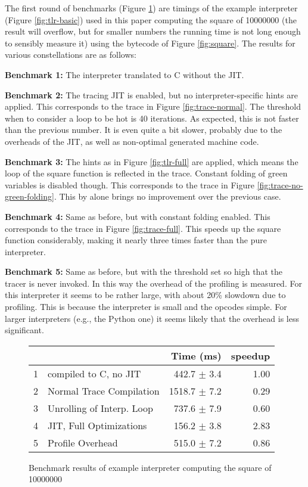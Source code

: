 \documentclass{sig-alternate}
\newcommand\eg{e.g.,\xspace}
\begin{document}
The first round of benchmarks (Figure \ref{fig:bench1}) are timings of the
example interpreter (Figure \ref{fig:tlr-basic}) used in this paper computing
the square of 10000000 (the result will overflow, but for smaller numbers the
running time is not long enough to sensibly measure it)
using the bytecode of Figure \ref{fig:square}. The results for various
constellations are as follows:

\textbf{Benchmark 1:} The interpreter translated to C without the JIT.

\textbf{Benchmark 2:} The tracing JIT is enabled, but no inter\-preter-specific
hints are applied. This corresponds to the trace in Figure
\ref{fig:trace-normal}.  The threshold when to consider a loop to be hot is 40
iterations.  As expected, this is not faster than the previous number. It is
even quite a bit slower, probably due to the overheads of the JIT, as well as
non-optimal generated machine code.

\textbf{Benchmark 3:} The hints as in Figure \ref{fig:tlr-full} are applied, which means the loop of
the square function is reflected in the trace. Constant folding of green
variables is disabled though. This corresponds to the trace in Figure
\ref{fig:trace-no-green-folding}. This by alone brings no improvement over the
previous case.

\textbf{Benchmark 4:} Same as before, but with constant folding enabled. This corresponds to the
trace in Figure \ref{fig:trace-full}. This speeds up the square function considerably,
making it nearly three times faster than the pure interpreter.

\textbf{Benchmark 5:} Same as before, but with the threshold set so high that the tracer is
never invoked. In this way the overhead of the profiling is measured. For this interpreter
it seems to be rather large, with about 20\% slowdown due to profiling. This is because the interpreter 
is small and the opcodes simple. For larger interpreters (\eg the Python one) it seems 
likely that the overhead is less significant.

\begin{figure}
\noindent
\begin{tabular}{|l|l|r|r|}
\hline
& &Time (ms) &speedup\\
\hline
1 &compiled to C, no JIT &442.7 $\pm$ 3.4 &1.00\\
2 &Normal Trace Compilation &1518.7 $\pm$ 7.2 &0.29\\
3 &Unrolling of Interp. Loop &737.6 $\pm$ 7.9 &0.60\\
4 &JIT, Full Optimizations &156.2 $\pm$ 3.8 &2.83\\
5 &Profile Overhead &515.0 $\pm$ 7.2 &0.86\\
\hline
\end{tabular}
\caption{Benchmark results of example interpreter computing the square of
\label{fig:bench1}
10000000}
\end{figure}
\end{document}
